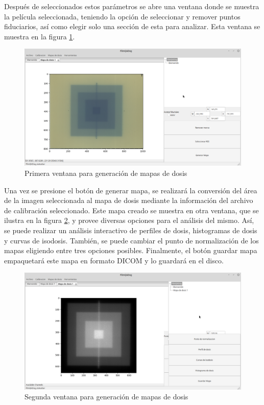 Después de seleccionados estos parámetros se abre una ventana donde se muestra la película seleccionada, teniendo la opción de seleccionar y remover puntos fiduciarios, así como elegir solo una sección de esta para analizar. Esta ventana se muestra en la figura \ref{fig:ventanaMapaDosis1}.\\
\begin{figure}[H]
	\centering
	\includegraphics[width=0.7\linewidth]{images/imagenesDocumentacion/ventanaMapaDosis.png}
	\caption{Primera ventana para generación de mapas de dosis }
	\label{fig:ventanaMapaDosis1}
\end{figure}

Una vez se presione el botón de generar mapa, se realizará la conversión del área de la imagen seleccionada al mapa de dosis mediante la información del archivo de calibración seleccionado. Este mapa creado se muestra en otra ventana, que se ilustra en la figura \ref{fig:ventanaMapaDosis2}, y provee diversas opciones para el análisis del mismo. Así, se puede realizar un análisis interactivo de perfiles de dosis, histogramas de dosis y curvas de isodosis. También, se puede cambiar el punto de normalización de los mapas eligiendo entre tres opciones posibles. Finalmente, el botón guardar mapa empaquetará este mapa en formato DICOM y lo guardará en el disco.\\

\begin{figure}[H]
	\centering
	\includegraphics[width=0.7\linewidth]{images/imagenesDocumentacion/ventanaMapaDosis2.png}
	\caption{Segunda ventana para generación de mapas de dosis }
	\label{fig:ventanaMapaDosis2}
\end{figure}

